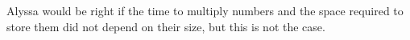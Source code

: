 Alyssa would be right if the time to multiply numbers and the space required to store them did not depend on their size, but this is not the case.
